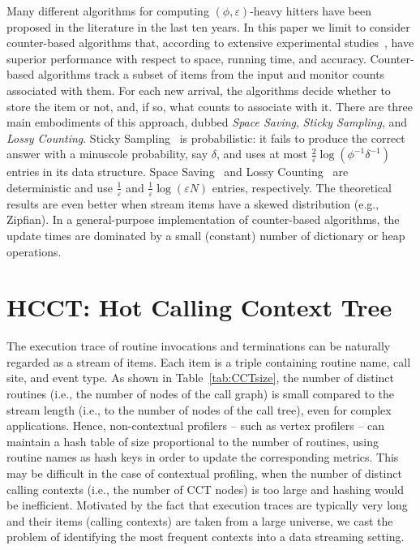 \documentclass[preprint]{sigplanconf}
\begin{document}
Many different algorithms for computing $(\phi,\varepsilon)$-heavy hitters have been proposed in the literature in the last ten years. In this paper we limit to consider counter-based algorithms that, according to extensive experimental studies~\cite{CH08}, have superior performance with respect to space, running time, and accuracy. Counter-based algorithms track a subset of items from the input and monitor counts associated with them. For each new arrival, the algorithms decide whether to store the item or not, and, if so, what counts to associate with it. There are three main embodiments of this approach, dubbed {\em Space Saving}, {\em Sticky Sampling}, and {\em Lossy Counting}. Sticky Sampling~\cite{MM02} is probabilistic: it fails to produce the correct answer with a minuscole probability, say $\delta$, and uses at most $\frac{2}{\varepsilon} \log(\phi^{-1}\delta^{-1})$ entries in its data structure. Space Saving~\cite{MAA06} and Lossy Counting~\cite{MM02} are deterministic and use $\frac{1}{\varepsilon}$ and $\frac{1}{\varepsilon}\log(\varepsilon N)$ entries, respectively. The theoretical results are even better when stream items have a skewed distribution (e.g., Zipfian). In a general-purpose implementation of counter-based algorithms, the update times are dominated by a small (constant) number of dictionary or heap operations.


\section{HCCT: Hot Calling Context Tree}
\label{se:hot}

The execution trace of routine invocations and terminations can be naturally regarded as a stream of items. Each item is a triple containing routine name, call site, and event type. As shown in Table~\ref{tab:CCTsize}, the number of distinct routines (i.e., the number of nodes of the call graph) is small compared to the stream length (i.e., to the number of nodes of the call tree), even for complex applications. Hence, non-contextual profilers -- such as vertex profilers -- can maintain a hash table of size proportional to the number of routines, using routine names as hash keys in order to update the corresponding metrics.  This may be difficult in the case of contextual profiling, when the number of distinct calling contexts (i.e., the number of CCT nodes) is too large and hashing would be inefficient. Motivated by the fact that execution traces are typically very long and their items (calling contexts) are taken from a large universe, we cast the problem of identifying the most frequent contexts into a data streaming setting.
\end{document}
